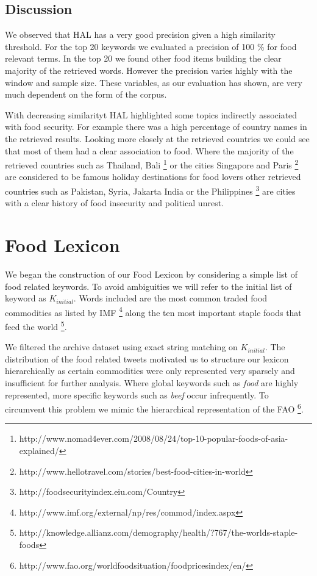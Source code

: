  
\subsection{Discussion}

We observed that HAL has a very good precision given a high similarity threshold. For the top 20 keywords we evaluated a precision of 100 \% for food relevant terms. In the top 20 we found other food items building the clear majority of the retrieved words. However the precision varies highly with the window and sample size. These variables, as our evaluation has shown, are very much dependent on the form of the corpus.  

With decreasing similarityt HAL highlighted some topics indirectly associated with food security. For example there was  a high percentage of country names in the retrieved results. Looking more closely at the retrieved countries we could see that most of them had a clear association to food. Where the majority of the retrieved countries such as Thailand, Bali \footnote{http://www.nomad4ever.com/2008/08/24/top-10-popular-foods-of-asia-explained/} or the cities Singapore and Paris \footnote{http://www.hellotravel.com/stories/best-food-cities-in-world} are considered to be famous holiday destinations for food lovers other retrieved countries such as Pakistan, Syria, Jakarta India or the Philippines \footnote{http://foodsecurityindex.eiu.com/Country} are cities with a clear history of food insecurity and political unrest. 





\section{Food Lexicon}
\label{food_lex}

We began the construction of our Food Lexicon by considering  a simple list of food related keywords. To avoid ambiguities we will refer to the initial list of keyword as $K_{initial}$. Words included are the most common traded food commodities as listed by IMF \footnote{http://www.imf.org/external/np/res/commod/index.aspx} along the ten most important staple foods that feed the world \footnote{http://knowledge.allianz.com/demography/health/?767/the-worlds-staple-foods}. 

We filtered the archive dataset using exact string matching on $K_{initial}$. The distribution of the food related tweets motivated us to structure our lexicon hierarchically as certain commodities were only represented very sparsely and insufficient for further analysis. Where global keywords such as \emph{food} are highly represented, more specific keywords such as \emph{beef} occur infrequently. To circumvent this problem we mimic the hierarchical representation of the FAO   \footnote{http://www.fao.org/worldfoodsituation/foodpricesindex/en/}. 

